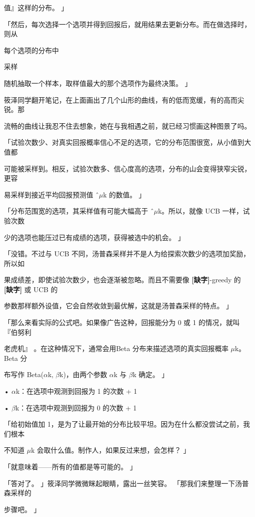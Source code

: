 值』这样的分布。 」\par
「然后，每次选择一个选项并得到回报后，就用结果去更新分布。而在做选择时，则从\par
每个选项的分布中\par
采样\par
随机抽取一个样本，取样值最大的那个选项作为最终决策。 」\par
筱泽同学翻开笔记，在上面画出了几个山形的曲线，有的低而宽缓，有的高而尖锐。那\par
流畅的曲线让我忍不住去想象，她在与我相遇之前，就已经习惯画这种图景了吗。\par
「试验次数少、对真实回报概率信心不足的选项，它的分布范围很宽，从小值到大值都\par
可能被采样到。相反，试验次数多、信心度高的选项，分布的山会变得狭窄尖锐，更容\par
易采样到接近平均回报预测值 ˆ$\mu$k 的数值。 」\par
「分布范围宽的选项，其采样值有可能大幅高于 ˆ$\mu$k。所以，就像 UCB 一样，试验次数\par
少的选项也能压过已有成绩的选项，获得被选中的机会。 」\par
「没错。不过与 UCB 不同，汤普森采样并不是人为给探索次数少的选项加奖励，所以如\par
果成绩差，即使试验次数少，也会逐渐被忽略。而且不需要像 \textbf{[缺字]}-greedy 的 \textbf{[缺字]} 或 UCB 的\par
参数那样额外设值，它会自然收敛到最优解，这就是汤普森采样的特点。 」\par
「那么来看实际的公式吧。如果像广告这种，回报能分为 0 或 1 的情况，就叫『伯努利\par
老虎机』 。在这种情况下，通常会用Beta 分布来描述选项的真实回报概率 $\mu$k。Beta 分\par
布写作 Beta($\alpha$k, $\beta$k)，由两个参数 $\alpha$k 与 $\beta$k 确定。 」\par
• $\alpha$k：在选项中观测到回报为 1 的次数 + 1\par
• $\beta$k：在选项中观测到回报为 0 的次数 + 1\par
「给初始值加 1，是为了让最开始的分布比较平坦。因为在什么都没尝试之前，我们根本\par
不知道 $\mu$k 会取什么值。制作人，如果反过来想，会怎样？ 」\par
「就意味着——所有的值都是等可能的。 」\par
「答对了。 」筱泽同学微微眯起眼睛，露出一丝笑容。 「那我们来整理一下汤普森采样的\par
步骤吧。 」\par
